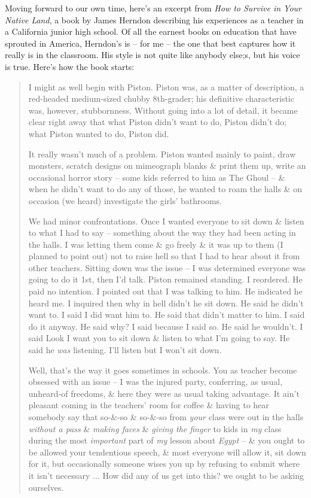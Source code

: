 \documentclass{article}
\begin{document}
Moving forward to our own time, here's an excerpt from \textit{How to Survive in Your Native Land}, a book by James Herndon describing his experiences as a teacher in a California junior high school. Of all the earnest books on education that have sprouted in America, Herndon's is -- for me -- the one that best captures how it really is in the classroom. His style is not quite like anybody else;s, but his voice is true. Here's how the book starts:
\begin{quotation}
	I might as well begin with Piston. Piston was, as a matter of description, a red-headed medium-sized chubby 8th-grader; his definitive characteristic was, however, stubbornness. Without going into a lot of detail, it became clear right away that what Piston didn't want to do, Piston didn't do; what Piston wanted to do, Piston did.
	
	It really wasn't much of a problem. Piston wanted mainly to paint, draw monsters, scratch designs on mimeograph blanks \& print them up, write an occasional horror story -- some kids referred to him as The Ghoul -- \& when he didn't want to do any of those, he wanted to roam the halls \& on occasion (we heard) investigate the girls' bathrooms.
	
	We had minor confrontations. Once I wanted everyone to sit down \& listen to what I had to say -- something about the way they had been acting in the halls. I was letting them come \& go freely \& it was up to them (I planned to point out) not to raise hell so that I had to hear about it from other teachers. Sitting down was the issue -- I was determined everyone was going to do it 1st, then I'd talk. Piston remained standing. I reordered. He paid no intention. I pointed out that I was talking to him. He indicated he heard me. I inquired then why in hell didn't he sit down. He said he didn't want to. I said I did want him to. He said that didn't matter to him. I said do it anyway. He said why? I said because I said so. He said he wouldn't. I said Look I want you to sit down \& listen to what I'm going to say. He said he \textit{was} listening. I'll listen but I won't sit down.
	
	Well, that's the way it goes sometimes in schools. You as teacher become obsessed with an issue -- I was the injured party, conferring, as usual, unheard-of freedoms, \& here they were as usual taking advantage. It ain't pleasant coming in the teachers' room for coffee \& having to hear somebody say that so-\&-so \& so-\&-so from \textit{your} class were out in the halls \textit{without a pass} \& \textit{making faces} \& \textit{giving the finger} to kids in \textit{my} class during the most \textit{important} part of \textit{my} lesson about \textit{Egypt} -- \& you ought to be allowed your tendentious speech, \& most everyone will allow it, sit down for it, but occasionally someone wises you up by refusing to submit where it isn't necessary $\ldots$ How did any of us get into this? we ought to be asking ourselves.
\end{quotation}
\end{document}
